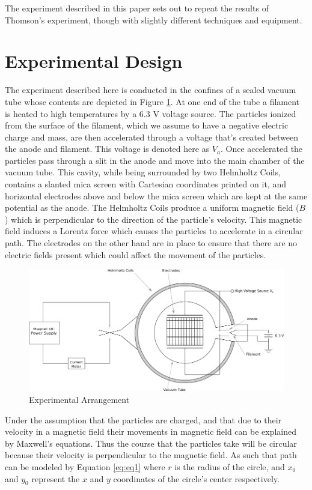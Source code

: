 \documentclass[prb,preprint]{revtex4-1}
\begin{document}
The experiment described in this paper sets out to repeat the results of Thomson's experiment, though with slightly different techniques and equipment.

\section{Experimental Design}

The experiment described here is conducted in the confines of a sealed vacuum tube whose contents are depicted in Figure \ref{datafig}. At one end of the tube a filament is heated to high temperatures by a 6.3 V voltage source. The particles ionized from the surface of the filament, which we assume to have a negative electric charge and mass, are then accelerated through a voltage that's created between the anode and filament. This voltage is denoted here as $V_a$. Once accelerated the particles pass through a slit in the anode and move into the main chamber of the vacuum tube. This cavity, while being surrounded by two Helmholtz Coils, contains a slanted mica screen with Cartesian coordinates printed on it, and horizontal electrodes above and below the mica screen which are kept at the same potential as the anode. The Helmholtz Coils produce a uniform magnetic field ($B$) which is perpendicular to the direction of the particle's velocity. This magnetic field induces a Lorentz force which causes the particles to accelerate in a circular path. The electrodes on the other hand are in place to ensure that there are no electric fields present which could affect the movement of the particles.

	\begin{figure}[h]
		\includegraphics[width=.8\textwidth]{ExpFigure.png}
		\caption{Experimental Arrangement}
		\label{datafig}
	\end{figure}

Under the assumption that the particles are charged, and that due to their velocity in a magnetic field their movements in magnetic field can be explained by Maxwell's equations. Thus the course that the particles take will be circular because their velocity is perpendicular to the magnetic field. As such that path can be modeled by Equation \eqref{eq:eq1} where $r$ is the radius of the circle, and $x_0$ and $y_0$ represent the $x$ and $y$ coordinates of the circle's center respectively.
\end{document}

